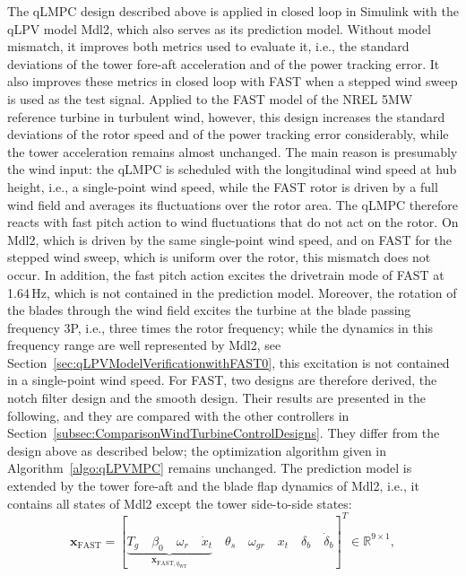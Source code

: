 The qLMPC design described above is applied in closed loop in Simulink with the qLPV model Mdl2, which also serves as its prediction model. Without model mismatch, it improves both metrics used to evaluate it, i.e., the standard deviations of the tower fore-aft acceleration and of the power tracking error. It also improves these metrics in closed loop with FAST when a stepped wind sweep is used as the test signal. Applied to the FAST model of the NREL 5MW reference turbine in turbulent wind, however, this design increases the standard deviations of the rotor speed and of the power tracking error considerably, while the tower acceleration remains almost unchanged. The main reason is presumably the wind input: the qLMPC is scheduled with the longitudinal wind speed at hub height, i.e., a single-point wind speed, while the FAST rotor is driven by a full wind field and averages its fluctuations over the rotor area. The qLMPC therefore reacts with fast pitch action to wind fluctuations that do not act on the rotor. On Mdl2, which is driven by the same single-point wind speed, and on FAST for the stepped wind sweep, which is uniform over the rotor, this mismatch does not occur. In addition, the fast pitch action excites the drivetrain mode of FAST at 1.64\,Hz, which is not contained in the prediction model. Moreover, the rotation of the blades through the wind field excites the turbine at the blade passing frequency 3P, i.e., three times the rotor frequency; while the dynamics in this frequency range are well represented by Mdl2, see Section~\ref{sec:qLPVModelVerificationwithFAST0}, this excitation is not contained in a single-point wind speed. For FAST, two designs are therefore derived, the notch filter design and the smooth design. Their results are presented in the following, and they are compared with the other controllers in Section~\ref{subsec:ComparisonWindTurbineControlDesigns}. They differ from the design above as described below; the optimization algorithm given in Algorithm~\ref{algo:qLPVMPC} remains unchanged.
The prediction model is extended by the tower fore-aft and the blade flap dynamics of Mdl2, i.e., it contains all states of Mdl2 except the tower side-to-side states:
\begin{equation*}
    \bm{x}_{\text{FAST}} = [\underbrace{T_g \quad \beta_0 \quad \omega_r \quad  \dot{x}_t}_{ \bm{x}_{\text{FAST},q_{\text{WT}}}} \quad \theta_{s} \quad  \omega_{gr} \quad x_t \quad \delta_b \quad \dot{\delta}_b]^T \in \mathbb{R}^{9 \times 1},
\end{equation*}

